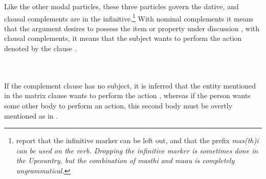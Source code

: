 

Like the other modal particles, these three particles govern the dative, and clausal complements are in the infinitive.\footnote{\citet[172f]{SmithEtAl2007} report that the infinitive marker can be left out, and that the  prefix \em mas(th)i \em can be used on the verb. Dropping the infinitive marker is sometimes done in the Upcountry, but the combination of \em masthi \em and \em maau \em is completely ungrammatical.}
With nominal complements it means that the argument desires to possess the item or property under discussion , with clausal complements, it means that the subject wants to perform the action denoted by the clause .



\\

\\

 If the complement clause has no subject, it is inferred that the entity mentioned in the  matrix clause wants to perform the action  , whereas if the person wants some other body to perform an action, this second body must be overtly mentioned as in .



